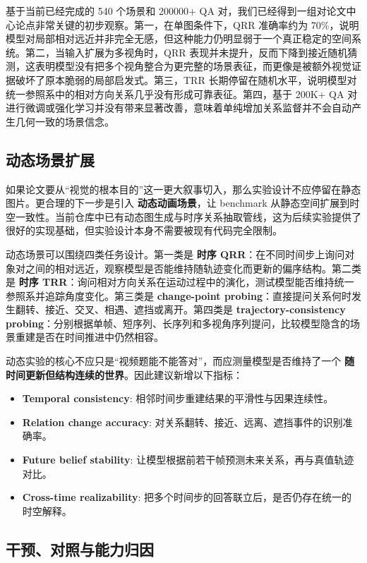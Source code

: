 基于当前已经完成的 540 个场景和 200000+ QA 对，我们已经得到一组对论文中心论点非常关键的初步观察。第一，在单图条件下，QRR 准确率约为 70\%，说明模型对局部相对远近并非完全无感，但这种能力仍明显弱于一个真正稳定的空间系统。第二，当输入扩展为多视角时，QRR 表现并未提升，反而下降到接近随机猜测，这表明模型没有把多个视角整合为更完整的场景表征，而更像是被额外视觉证据破坏了原本脆弱的局部启发式。第三，TRR 长期停留在随机水平，说明模型对统一参照系中的相对方向关系几乎没有形成可靠表征。第四，基于 200K+ QA 对进行微调或强化学习并没有带来显著改善，意味着单纯增加关系监督并不会自动产生几何一致的场景信念。

\subsection{动态场景扩展}

如果论文要从“视觉的根本目的”这一更大叙事切入，那么实验设计不应停留在静态图片。更合理的下一步是引入 \textbf{动态动画场景}，让 benchmark 从静态空间扩展到时空一致性。当前仓库中已有动态图生成与时序关系抽取管线，这为后续实验提供了很好的实现基础，但实验设计本身不需要被现有代码完全限制。

动态场景可以围绕四类任务设计。第一类是 \textbf{时序 QRR}：在不同时间步上询问对象对之间的相对远近，观察模型是否能维持随轨迹变化而更新的偏序结构。第二类是 \textbf{时序 TRR}：询问相对方向关系在运动过程中的演化，测试模型能否维持统一参照系并追踪角度变化。第三类是 \textbf{change-point probing}：直接提问关系何时发生翻转、接近、交叉、相遇、遮挡或离开。第四类是 \textbf{trajectory-consistency probing}：分别根据单帧、短序列、长序列和多视角序列提问，比较模型隐含的场景重建是否在时间推进中仍然相容。

动态实验的核心不应只是“视频题能不能答对”，而应测量模型是否维持了一个 \textbf{随时间更新但结构连续的世界}。因此建议新增以下指标：
\begin{itemize}[leftmargin=1.5em]
\item \textbf{Temporal consistency}: 相邻时间步重建结果的平滑性与因果连续性。
\item \textbf{Relation change accuracy}: 对关系翻转、接近、远离、遮挡事件的识别准确率。
\item \textbf{Future belief stability}: 让模型根据前若干帧预测未来关系，再与真值轨迹对比。
\item \textbf{Cross-time realizability}: 把多个时间步的回答联立后，是否仍存在统一的时空解释。
\end{itemize}

\subsection{干预、对照与能力归因}

